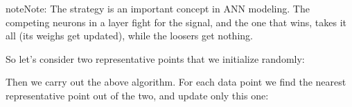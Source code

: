\documentclass[letterpaper,10pt,english]{jupyterBook}
\begin{document}
\begin{sphinxadmonition}{note}{Note:}
\sphinxAtStartPar
The  strategy is an important concept in ANN modeling. The competing neurons in a layer fight for the signal, and the one that wins, takes it all (its weighs get updated), while the loosers get nothing.
\end{sphinxadmonition}

\sphinxAtStartPar
So let’s consider two representative points that we initialize randomly:

\begin{sphinxVerbatim}[commandchars=\\\{\}]
\PYG{p}{[} \PYG{p}{]}
\PYG{p}{[} \PYG{p}{]}
\end{sphinxVerbatim}

\sphinxAtStartPar
Then we carry out the above algorithm. For each data point we find the nearest representative point out of the two, and update only this one:
\end{document}
